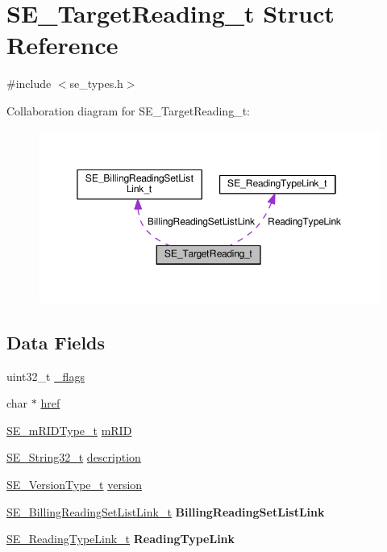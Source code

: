 \hypertarget{structSE__TargetReading__t}{}\section{S\+E\+\_\+\+Target\+Reading\+\_\+t Struct Reference}
\label{structSE__TargetReading__t}


{\ttfamily \#include $<$se\+\_\+types.\+h$>$}



Collaboration diagram for S\+E\+\_\+\+Target\+Reading\+\_\+t\+:\nopagebreak
\begin{figure}[H]
\begin{center}
\leavevmode
\includegraphics[width=350pt]{structSE__TargetReading__t__coll__graph}
\end{center}
\end{figure}
\subsection*{Data Fields}
\begin{DoxyCompactItemize}
\item 
uint32\+\_\+t \hyperlink{group__TargetReading_gaaf344e38f87e901981538342c80f3d6f}{\+\_\+flags}
\item 
char $\ast$ \hyperlink{group__TargetReading_gaea2bf3a76c988bc1e063e3230087b17e}{href}
\item 
\hyperlink{group__mRIDType_gac74622112f3a388a2851b2289963ba5e}{S\+E\+\_\+m\+R\+I\+D\+Type\+\_\+t} \hyperlink{group__TargetReading_gaba82706ff98671daae1c9e06ee1e0d12}{m\+R\+ID}
\item 
\hyperlink{group__String32_gac9f59b06b168b4d2e0d45ed41699af42}{S\+E\+\_\+\+String32\+\_\+t} \hyperlink{group__TargetReading_gab528105e52e927d416310936aefb3b49}{description}
\item 
\hyperlink{group__VersionType_ga4b8d27838226948397ed99f67d46e2ae}{S\+E\+\_\+\+Version\+Type\+\_\+t} \hyperlink{group__TargetReading_gae96ed0578c2f7248515997778cee5da8}{version}
\item 
\hyperlink{structSE__BillingReadingSetListLink__t}{S\+E\+\_\+\+Billing\+Reading\+Set\+List\+Link\+\_\+t} {\bfseries Billing\+Reading\+Set\+List\+Link}
\item 
\hyperlink{structSE__ReadingTypeLink__t}{S\+E\+\_\+\+Reading\+Type\+Link\+\_\+t} {\bfseries Reading\+Type\+Link}
\end{DoxyCompactItemize}


